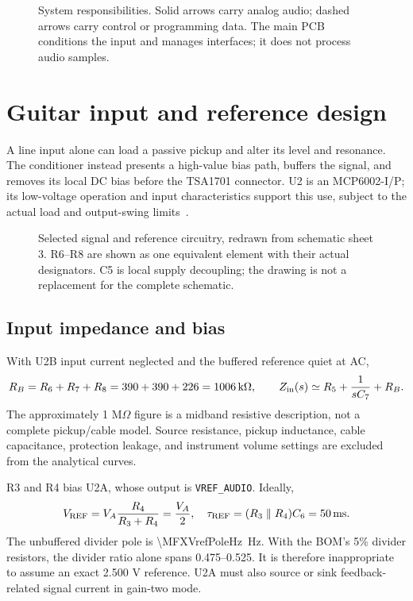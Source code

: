 \documentclass[a4paper,10pt]{article}
\newcommand{\nextsection}[1]{\clearpage\section{#1}}
\newcommand{\net}[1]{\texttt{#1}}
\begin{document}
\begin{figure}[H]\centering\MFXArchitectureDiagram
\caption{System responsibilities. Solid arrows carry analog audio; dashed arrows carry control or programming data. The main PCB conditions the input and manages interfaces; it does not process audio samples.}\label{fig:architecture}
\end{figure}

\nextsection{Guitar input and reference design}
\label{sec:analog}
A line input alone can load a passive pickup and alter its level and resonance. The conditioner instead presents a high-value bias path, buffers the signal, and removes its local DC bias before the TSA1701 connector. U2 is an MCP6002-I/P; its low-voltage operation and input characteristics support this use, subject to the actual load and output-swing limits~\cite{mcp6002}.

\begin{figure}[H]\centering\MFXInputCircuitDiagram
\caption{Selected signal and reference circuitry, redrawn from schematic sheet 3. R6--R8 are shown as one equivalent element with their actual designators. C5 is local supply decoupling; the drawing is not a replacement for the complete schematic.}\label{fig:input}
\end{figure}

\subsection{Input impedance and bias}
With U2B input current neglected and the buffered reference quiet at AC,
\begin{equation}
R_B=R_6+R_7+R_8=390+390+226=\SI{1006}{\kilo\ohm},\qquad
Z_{\rm in}(s)\simeq R_5+\frac{1}{sC_7}+R_B.
\end{equation}
The approximately 1 M$\Omega$ figure is a midband resistive description, not a complete pickup/cable model. Source resistance, pickup inductance, cable capacitance, protection leakage, and instrument volume settings are excluded from the analytical curves.

R3 and R4 bias U2A, whose output is \net{VREF\_AUDIO}. Ideally,
\begin{equation}
V_{\rm REF}=V_A\frac{R_4}{R_3+R_4}=\frac{V_A}{2},\quad
\tau_{\rm REF}=(R_3\parallel R_4)C_6=\SI{50}{\milli\second}.
\end{equation}
The unbuffered divider pole is \SI{\MFXVrefPoleHz}{\hertz}. With the BOM's 5\% divider resistors, the divider ratio alone spans 0.475--0.525. It is therefore inappropriate to assume an exact 2.500 V reference. U2A must also source or sink feedback-related signal current in gain-two mode.
\end{document}
